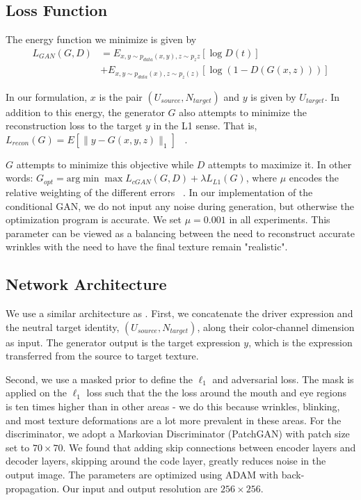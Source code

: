 \subsection{Loss Function}

The energy function we minimize is given by 
\begin{equation} \label{eqn:1}
\begin{split}
L_{GAN}(G,D)& = E_{{x,y}\sim p_{data}({x,y}),z\sim p_z{z}}[\log D({t})]\\
& +E_{{x,y}\sim p_{data}(x),z\sim p_z(z)}[\log(1-D(G(x,z)))] 
\end{split}
\end{equation}

In our formulation, $x$ is the pair $(U_{source}, N_{target})$ and $y$ is given by $U_{target}$.  
In addition to this energy, the generator $G$ also attempts to minimize the reconstruction loss to the target $y$ in the L1 sense.  
That is, $L_{recon}(G)= E[\parallel y-G({x,y},z)\parallel_1]$ ~\cite{pix2pix}.

$G$ attempts to minimize this objective while $D$ attempts to maximize it.  In other words:
$ G_{opt}=\text{arg}\min\max L_{cGAN}(G,D)+\lambda L_{L1}(G)$, where $\mu$ 
encodes the relative weighting of the different errors ~\cite{pix2pix}.  In our implementation of the conditional GAN, 
we do not input any noise during generation, but otherwise the optimization program is accurate.  We set $\mu = 0.001$ in all experiments. 
This parameter can be viewed as a balancing between the need to reconstruct accurate wrinkles with the need to have the final texture
remain "realistic".  

\subsection{Network Architecture}


We use a similar architecture as \cite{pix2pix}. 
First, we concatenate the driver expression and the neutral target identity, $(U_{source}, N_{target})$, along their color-channel dimension as input.
The generator output is the target expression $y$, which is the expression transferred from the source to target texture.

Second, we use a masked prior to define the $\ell_1$ and adversarial loss. 
The mask is applied on the $\ell_1$ loss such that the the loss around the mouth and eye regions is ten times higher than in other areas - we
do this because wrinkles, blinking, and most texture deformations are a lot more prevalent in these areas.  
For the discriminator, we adopt a Markovian Discriminator 
(PatchGAN) with patch size set to $70 \times 70$. We found that adding skip connections between
encoder layers and decoder layers, skipping around the code layer, greatly reduces noise in the output image. 
The parameters are
optimized using ADAM with back-propagation. Our input and output resolution are $256\times 256$.


